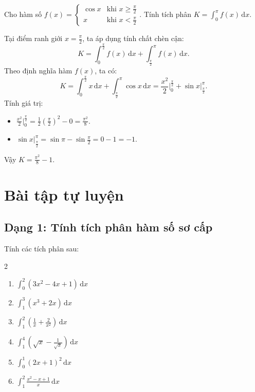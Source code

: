 \documentclass[12pt]{article}
\begin{document}
	\begin{vidu}
		Cho hàm số $f(x) = \begin{cases} \cos x & \text{khi } x \ge \frac{\pi}{2} \\ x & \text{khi } x < \frac{\pi}{2} \end{cases}$. Tính tích phân $K = \displaystyle \int_{0}^{\pi} f(x)\,\mathrm{d}x$.
	\end{vidu}
	\begin{loigiai}
		Tại điểm ranh giới $x = \frac{\pi}{2}$, ta áp dụng tính chất chèn cận:
		\[
		K = \int_{0}^{\frac{\pi}{2}} f(x)\,\mathrm{d}x + \int_{\frac{\pi}{2}}^{\pi} f(x)\,\mathrm{d}x.
		\]
		Theo định nghĩa hàm $f(x)$, ta có:
		\[
		K = \int_{0}^{\frac{\pi}{2}} x\,\mathrm{d}x + \int_{\frac{\pi}{2}}^{\pi} \cos x\,\mathrm{d}x = \frac{x^2}{2} \Bigg|_0^{\frac{\pi}{2}} + \sin x \Bigg|_{\frac{\pi}{2}}^{\pi}.
		\]
		Tính giá trị:
		\begin{itemize}
			\item $\displaystyle \frac{x^2}{2} \Bigg|_0^{\frac{\pi}{2}} = \frac{1}{2} \left( \frac{\pi}{2} \right)^2 - 0 = \frac{\pi^2}{8}$.
			\item $\displaystyle \sin x \Bigg|_{\frac{\pi}{2}}^{\pi} = \sin \pi - \sin \frac{\pi}{2} = 0 - 1 = -1$.
		\end{itemize}
		Vậy $K = \frac{\pi^2}{8} - 1$.
	\end{loigiai}
	
	\newpage
	
	\section{Bài tập tự luyện}\label{sec:baitap}
	
	\subsection{Dạng 1: Tính tích phân hàm số sơ cấp}
	\begin{btxanh}
		Tính các tích phân sau:
		\begin{multicols}{2}
			\begin{enumerate}[label=\alph*)]
				\item $\displaystyle \int_0^2 (3x^2 - 4x + 1)\,\mathrm{d}x$
				\item $\displaystyle \int_1^3 (x^3 + 2x)\,\mathrm{d}x$
				\item $\displaystyle \int_1^2 \left( \frac{1}{x} + \frac{2}{x^2} \right)\,\mathrm{d}x$
				\item $\displaystyle \int_1^4 \left( \sqrt{x} - \frac{1}{\sqrt{x}} \right)\,\mathrm{d}x$
				\item $\displaystyle \int_0^1 (2x + 1)^2\,\mathrm{d}x$
				\item $\displaystyle \int_1^2 \frac{x^2 - x + 1}{x}\,\mathrm{d}x$
			\end{enumerate}
		\end{multicols}
	\end{btxanh}
	
\end{document}
